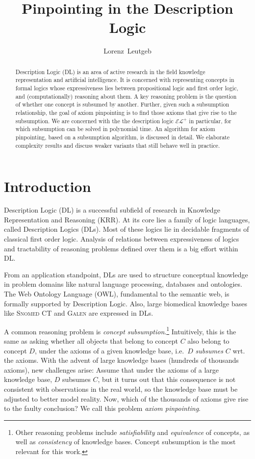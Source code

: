 \documentclass{llncs}
\title{Pinpointing in the Description Logic \elp}
\author{Lorenz~Leutgeb}
\institute{International Center for Computational Logic, TU Dresden\\ \email{lorenz.leutgeb@mailbox.tu-dresden.de}}
\newcommand{\elp}{\ensuremath{\mathcal{EL^+}}\xspace}
\newcommand{\snomed}{\textsc{Snomed CT}\xspace}
\newcommand{\galen}{\textsc{Galen}\xspace}
\begin{document}
\maketitle

\begin{abstract}
Description Logic (DL) is an area of active research in the field knowledge representation and artificial intelligence. It is concerned with representing concepts in formal logics whose expressiveness lies between propositional logic and first order logic, and (computationally) reasoning about them.
A key reasoning problem is the question of whether one concept is subsumed by another. Further, given such a subsumption relationship, the goal of axiom pinpointing is to find those axioms that give rise to the subsumption.
We are concerned with the the description logic \elp in particular, for which subsumption can be solved in polynomial time. An algorithm for axiom pinpointing, based on a subsumption algorithm, is discussed
in detail. We elaborate complexity results and discuss weaker variants that still behave well in practice.
\end{abstract}

\section{Introduction}
\label{intro}

Description Logic (DL) is a successful subfield of research in Knowledge Representation and Reasoning (KRR). At its core lies a family of logic languages, called Description Logics  (DLs). Most of these logics lie in decidable fragments of classical first order logic. Analysis of relations between expressiveness of logics and tractability of reasoning problems defined over them is a big effort within DL.

From an application standpoint, DLs are used to structure conceptual knowledge in problem domains like natural language processing, databases and ontologies. The Web Ontology Language (OWL), fundamental to the semantic web, is formally supported by Description Logic. Also, large biomedical knowledge bases like \snomed and \galen are expressed in DLs.

A common reasoning problem is \emph{concept subsumption}.\footnote{Other reasoning problems include \emph{satisfiability} and \emph{equivalence} of concepts, as well as \emph{consistency} of knowledge bases. Concept subsumption is the most relevant for this work.} Intuitively, this is the same as asking whether all objects that belong to concept $C$ also belong to concept $D$, under the axioms of a given knowledge base, i.e.~$D$ \emph{subsumes} $C$ wrt. the axioms. With the advent of large knowledge bases (hundreds of thousands axioms), new challenges arise: Assume that under the axioms of a large knowledge base, $D$ subsumes $C$, but it turns out that this consequence is not consistent with observations in the real world, so the knowledge base must be adjusted to better model reality. Now, which of the thousands of axioms give rise to the faulty conclusion? We call this problem \emph{axiom pinpointing}.
\end{document}
